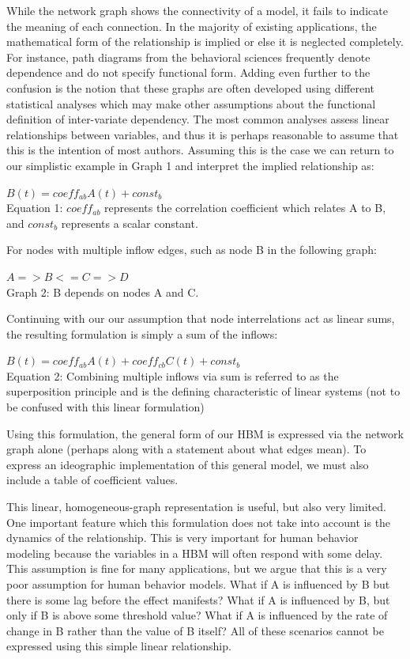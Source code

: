 \documentclass[runningheads,a4paper]{llncs}
\begin{document}
While the network graph shows the connectivity of a model, it fails to indicate the meaning of each connection.
In the majority of existing applications, the mathematical form of the relationship is implied or else it is neglected completely.
For instance, path diagrams from the behavioral sciences frequently denote dependence and do not specify functional form.
Adding even further to the confusion is the notion that these graphs are often developed using different statistical analyses which may make other assumptions about the functional definition of inter-variate dependency.
The most common analyses assess linear relationships between variables, and thus it is perhaps reasonable to assume that this is the intention of most authors.
Assuming this is the case we can return to our simplistic example in Graph 1 and interpret the implied relationship as:

\begin{centering}
$B(t) = coeff_{ab}A(t) + const_b$\\
\small{Equation 1: $coeff_{ab}$ represents the correlation coefficient which relates A to B, and $const_b$ represents a scalar constant.}
\end{centering}

For nodes with multiple inflow edges, such as node B in the following graph:

\begin{centering}
$A => B <= C => D$\\
\small{Graph 2: B depends on nodes A and C.}
\end{centering}

Continuing with our our assumption that node interrelations act as linear sums, the resulting formulation is simply a sum of the inflows:

\begin{centering}
$B(t) = coeff_{ab}A(t) + coeff_{cb}C(t) + const_b$\\
\small{Equation 2: Combining multiple inflows via sum is referred to as the superposition principle and is the defining characteristic of linear systems (not to be confused with this linear formulation)}
\end{centering}

Using this formulation, the general form of our HBM is expressed via the network graph alone (perhaps along with a statement about what edges mean).
To express an ideographic implementation of this general model, we must also include a table of coefficient values. 

This linear, homogeneous-graph representation is useful, but also very limited.
One important feature which this formulation does not take into account is the dynamics of the relationship.
This is very important for human behavior modeling because the variables in a HBM will often respond with some delay.
This assumption is fine for many applications, but we argue that this is a very poor assumption for human behavior models. What if A is influenced by B but there is some lag before the effect manifests?
What if A is influenced by B, but only if B is above some threshold value? What if A is influenced by the rate of change in B rather than the value of B itself? All of these scenarios cannot be expressed using this simple linear relationship. 
\end{document}
